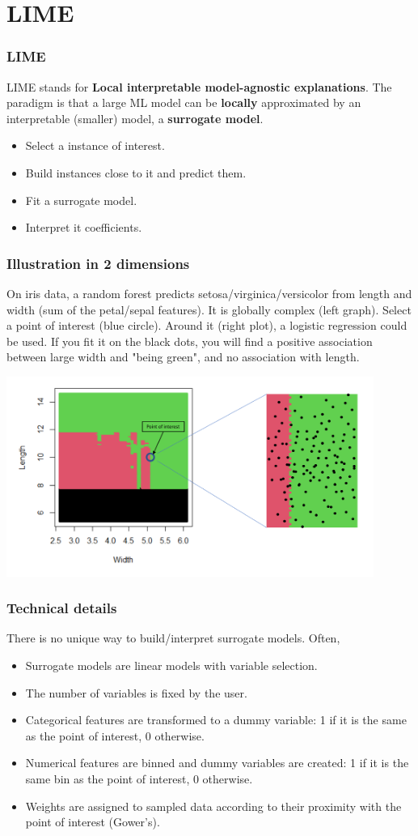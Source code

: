 \section{LIME}
\begin{frame}
\frametitle{LIME}
LIME stands for {\bf Local interpretable model-agnostic explanations}. The paradigm is that a large ML model can be {\bf locally} approximated by an interpretable (smaller) model, a {\bf surrogate model}. 
\begin{itemize}
\item Select a instance of interest.
\item Build instances close to it and predict them.
\item Fit a surrogate model.
\item Interpret it coefficients.
\end{itemize}
\end{frame}
\begin{frame}
\frametitle{Illustration in 2 dimensions}
\small
On iris data, a random forest predicts setosa/virginica/versicolor from length and width (sum of the petal/sepal features). It is globally complex (left graph). Select a point of interest (blue circle). Around it (right plot), a logistic regression could be used. If you fit it on the black dots, you will find a positive association between large width and "being green", and no association with length. 
\normalsize
\begin{center}
\includegraphics[width=12cm, page=2]{../Graphs/LIME_illustr.png}
\end{center}
\end{frame}
\begin{frame}
\frametitle{Technical details}
There is no unique way to build/interpret surrogate models. Often,
\begin{itemize}
\item Surrogate models are linear models with variable selection.
\item The number of variables is fixed by the user.
\item Categorical features are transformed to a dummy variable: 1 if it is the same as the point of interest, 0 otherwise.
\item Numerical features are binned and dummy variables are created: 1 if it is the same bin as the point of interest, 0 otherwise.
\item Weights are assigned to sampled data according to their proximity with the point of interest (Gower's).
\end{itemize}
\end{frame}
